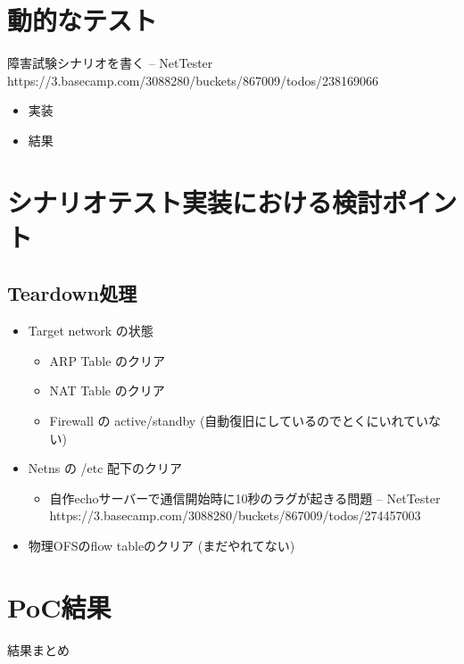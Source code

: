 \section{動的なテスト}

障害試験シナリオを書く – NetTester https://3.basecamp.com/3088280/buckets/867009/todos/238169066

\begin{itemize}
 \item 実装
 \item 結果
\end{itemize}

\section{シナリオテスト実装における検討ポイント}

\subsection{Teardown処理}

\begin{itemize}
 \item Target network の状態
       \begin{itemize}
        \item ARP Table のクリア
        \item NAT Table のクリア
        \item Firewall の active/standby (自動復旧にしているのでとくにいれていない)
       \end{itemize}
 \item Netns の /etc 配下のクリア
       \begin{itemize}
        \item 自作echoサーバーで通信開始時に10秒のラグが起きる問題 – NetTester https://3.basecamp.com/3088280/buckets/867009/todos/274457003
       \end{itemize}
 \item 物理OFSのflow tableのクリア (まだやれてない)
\end{itemize}

\section{PoC結果}

結果まとめ

